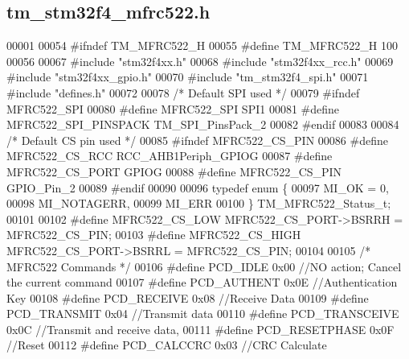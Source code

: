 \hypertarget{tm__stm32f4__mfrc522_8h_source}{}\subsection{tm\+\_\+stm32f4\+\_\+mfrc522.\+h}

\begin{DoxyCode}
00001 
00054 \textcolor{preprocessor}{#ifndef TM\_MFRC522\_H}
00055 \textcolor{preprocessor}{#define TM\_MFRC522\_H 100}
00056 
00067 \textcolor{preprocessor}{#include "stm32f4xx.h"}
00068 \textcolor{preprocessor}{#include "stm32f4xx\_rcc.h"}
00069 \textcolor{preprocessor}{#include "stm32f4xx\_gpio.h"}
00070 \textcolor{preprocessor}{#include "tm\_stm32f4\_spi.h"}
00071 \textcolor{preprocessor}{#include "defines.h"}
00072 
00078 \textcolor{comment}{/* Default SPI used */}
00079 \textcolor{preprocessor}{#ifndef MFRC522\_SPI}
00080 \textcolor{preprocessor}{#define MFRC522\_SPI                     SPI1}
00081 \textcolor{preprocessor}{#define MFRC522\_SPI\_PINSPACK            TM\_SPI\_PinsPack\_2}
00082 \textcolor{preprocessor}{#endif}
00083 
00084 \textcolor{comment}{/* Default CS pin used */}
00085 \textcolor{preprocessor}{#ifndef MFRC522\_CS\_PIN}
00086 \textcolor{preprocessor}{#define MFRC522\_CS\_RCC                  RCC\_AHB1Periph\_GPIOG}
00087 \textcolor{preprocessor}{#define MFRC522\_CS\_PORT                 GPIOG}
00088 \textcolor{preprocessor}{#define MFRC522\_CS\_PIN                  GPIO\_Pin\_2}
00089 \textcolor{preprocessor}{#endif}
00090 
00096 \textcolor{keyword}{typedef} \textcolor{keyword}{enum} \{
00097     MI\_OK = 0,
00098     MI\_NOTAGERR,
00099     MI\_ERR
00100 \} TM\_MFRC522\_Status\_t;
00101 
00102 \textcolor{preprocessor}{#define MFRC522\_CS\_LOW                  MFRC522\_CS\_PORT->BSRRH = MFRC522\_CS\_PIN;}
00103 \textcolor{preprocessor}{#define MFRC522\_CS\_HIGH                 MFRC522\_CS\_PORT->BSRRL = MFRC522\_CS\_PIN;}
00104 
00105 \textcolor{comment}{/* MFRC522 Commands */}
00106 \textcolor{preprocessor}{#define PCD\_IDLE                        0x00   //NO action; Cancel the current command}
00107 \textcolor{preprocessor}{#define PCD\_AUTHENT                     0x0E   //Authentication Key}
00108 \textcolor{preprocessor}{#define PCD\_RECEIVE                     0x08   //Receive Data}
00109 \textcolor{preprocessor}{#define PCD\_TRANSMIT                    0x04   //Transmit data}
00110 \textcolor{preprocessor}{#define PCD\_TRANSCEIVE                  0x0C   //Transmit and receive data,}
00111 \textcolor{preprocessor}{#define PCD\_RESETPHASE                  0x0F   //Reset}
00112 \textcolor{preprocessor}{#define PCD\_CALCCRC                     0x03   //CRC Calculate}

\end{DoxyCode}
